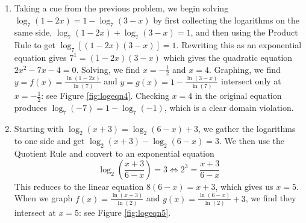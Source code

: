 {\begin{enumerate}
{}

\item  Taking a cue from the previous problem, we begin solving $\log_{7}(1-2x) = 1 - \log_{7}(3-x)$ by first collecting the logarithms on the same side, $\log_{7}(1-2x) +  \log_{7}(3-x) = 1$, and then using the Product Rule to get $\log_{7}[(1-2x)(3-x)] = 1$.  Rewriting this as an exponential equation gives $7^{1} = (1-2x)(3-x)$ which gives the quadratic equation $2x^2-7x-4=0$.  Solving, we find  $x = -\frac{1}{2}$ and $x=4$.  Graphing, we find $y = f(x) = \frac{\ln(1-2x)}{\ln(7)}$ and $y=g(x) = 1 - \frac{\ln(3-x)}{\ln(7)}$ intersect only at $x=-\frac{1}{2}$: see Figure \ref{fig:logeqn4}.  Checking $x=4$ in the original equation produces $\log_{7}(-7) = 1 - \log_{7}(-1)$, which is a clear domain violation.

{}

\item Starting with  $\log_{2}(x+3) = \log_{2}(6-x)+3$, we gather the logarithms to one side and get $\log_{2}(x+3) - \log_{2}(6-x) = 3$.  We then use the Quotient Rule and convert to an exponential equation 
\[
\log_{2}\left(\frac{x+3}{6-x}\right) = 3 \iff 2^{3} = \frac{x+3}{6-x}
\] 
 This reduces to the linear equation $8(6-x) = x+3$, which gives us $x = 5$.  When we graph $f(x) = \frac{\ln(x+3)}{\ln(2)}$ and $g(x) =  \frac{\ln(6-x)}{\ln(2)} + 3$, we find they intersect at $x=5$: see Figure \ref{fig:logeqn5}.

{}


\end{enumerate}}
